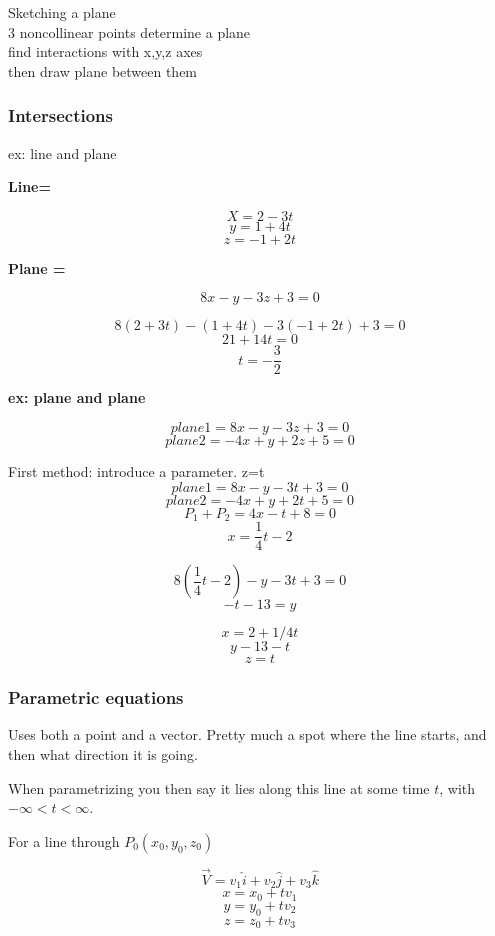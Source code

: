\documentclass{article}
\begin{document}
Sketching a plane\\
3 noncollinear points determine a plane \\
find interactions with x,y,z axes \\
then draw plane between them \\

\subsubsection{Intersections}

ex: line and plane 

\begin{center}
    \noindent \textbf{\large Line=}
\end{center}
\[X =2 -3t\]
\[y=1+4t\]
\[z=-1+2t\]

\begin{center}
    \noindent \textbf{\large Plane = }
\end{center}
\[8x -y -3z+3=0\]

\[8(2+3t) -(1+4t) -3(-1+2t) +3=0\]
\[21+14t=0\]
\[t=-\frac{3}{2}\]
\linebreak
\begin{center}
    \noindent \textbf{\large ex: plane and plane}
\end{center}
\[plane 1 = 8x-y-3z+3 = 0\]
\[plane 2 = -4x+y+2z+5 = 0\]

First method: introduce a parameter. z=t
\[plane 1 = 8x-y-3t+3 = 0\]
\[plane 2 = -4x+y+2t+5 = 0\]
\[P_1+P_2 = 4x -t +8 =0\]
\[x=\frac{1}{4}t-2\]

\[8(\frac{1}{4}t-2)-y-3t+3 = 0\]
\[-t-13=y\]

\[x=2+1/4t\]
\[y-13-t\]
\[z=t\]

\subsubsection{Parametric equations}
\begin{center}
    Uses both a point and a vector. Pretty much a spot where the line starts, and then what direction it is going. 

    When parametrizing you then say it lies along this line at some time $t$, with $-\infty < t < \infty$. 

    For a line through $P_0(x_0, y_0, z_0)$ 


    \[\vec{V} = v_1 \hat{i} + v_2\hat{j} +v_3\hat{k}\]
    \[x = x_0 + tv_1\]
    \[y = y_0 + tv_2\]
    \[z = z_0 + tv_3\] 

\end{center}
\[\]
\end{document}
